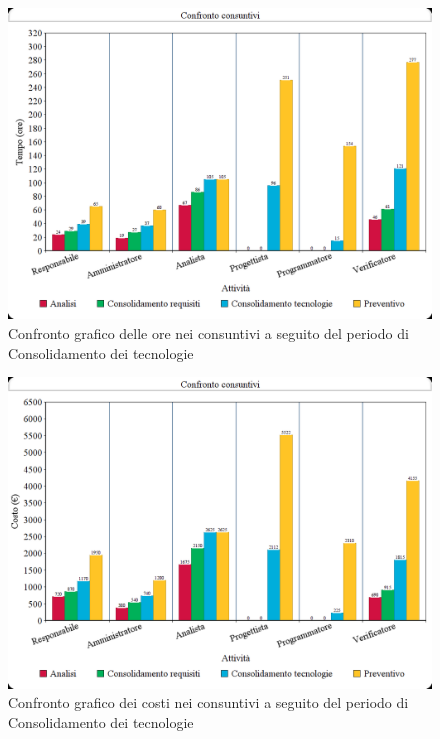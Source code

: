 \documentclass[./PianodiProgetto.tex]{subfiles}
\begin{document}
\begin{figure}[H]
	\centering
	\includegraphics[width=1\linewidth]{img/grafici/OreConsuntivo/consuntivo-ore-consolidamento_tecnologie}
	\caption{Confronto grafico delle ore nei consuntivi a seguito del periodo di Consolidamento dei tecnologie}
	\label{fig:consuntivo-ore-consolidamento_tecnologie}
\end{figure}

\begin{figure}[H]
	\centering
	\includegraphics[width=1\linewidth]{img/grafici/CostiConsuntivi/consuntivo-costo-consolidamento_tecnologie}
	\caption{Confronto grafico dei costi nei consuntivi a seguito del periodo di Consolidamento dei tecnologie}
	\label{fig:consuntivo-costi-consolidamento_tecnologie}
\end{figure}
\end{document}
